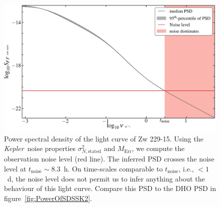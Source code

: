 \documentclass[a4paper,fleqn,usenatbib]{mnras}
\newcommand{\Kepler}{\textit{Kepler~}}
\begin{document}
\begin{figure}
    \includegraphics[width=\textwidth]{images/Zw229-15_PSD.jpg}
    \caption{Power spectral density of the light curve of Zw 229-15. Using the \Kepler noise properties $\sigma^{2}_{N,\mathrm{stated}}$ and $M_{\mathrm{Err}}$, we compute the observation noise level (red line). The inferred PSD crosses the noise level at $t_{\mathrm{noise}} \sim 8.3$~h. On time-scales comparable to $t_{\mathrm{noise}}$, i.e., $< 1$~d, the noise level does not permit us to infer anything about the behaviour of this light curve. Compare this PSD to the DHO PSD in figure~\ref{fig:PowerOfSDSSK2}.}
    \label{fig:Zw229-15_PSD}
\end{figure}
\end{document}

